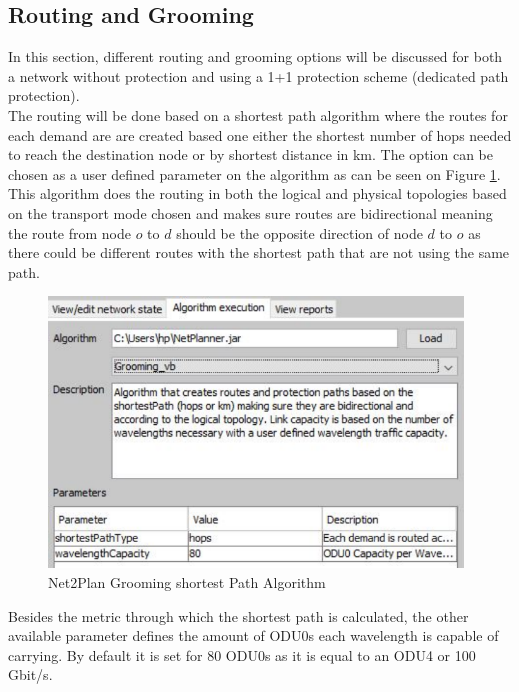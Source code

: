 	\subsection*{Routing and Grooming} \label{Routing and Grooming}
	In this section, different routing and grooming options will be discussed for both a network without protection and using a 1+1 protection scheme (dedicated path protection).\\
	The routing will be done based on a shortest path algorithm where the routes for each demand are are created based one either the shortest number of hops needed to reach the destination node or by shortest distance in km. The option can be chosen as a user defined parameter on the algorithm as can be seen on Figure \ref{Grooming_Algorithm}. This algorithm does the routing in both the logical and physical topologies based on the transport mode chosen and makes sure routes are bidirectional meaning the route from node $o$ to $d$ should be the opposite direction of node $d$ to $o$ as there could be different routes with the shortest path that are not using the same path.
	
	\vspace{0.5cm}
	\begin{figure}[h!]
		\centering
		\includegraphics[width = 11cm]{Grooming_Algorithm.pdf}
		\caption{Net2Plan Grooming shortest Path Algorithm}
		\label{Grooming_Algorithm}
	\end{figure}	
	
	Besides the metric through which the shortest path is calculated, the other available parameter defines the amount of ODU0s each wavelength is capable of carrying. By default it is set for 80 ODU0s as it is equal to an ODU4 or 100 Gbit/s.\\

	
